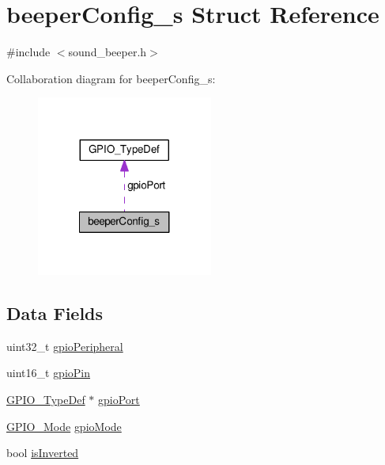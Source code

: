 \hypertarget{structbeeperConfig__s}{\section{beeper\+Config\+\_\+s Struct Reference}
\label{structbeeperConfig__s}
}


{\ttfamily \#include $<$sound\+\_\+beeper.\+h$>$}



Collaboration diagram for beeper\+Config\+\_\+s\+:\nopagebreak
\begin{figure}[H]
\begin{center}
\leavevmode
\includegraphics[width=164pt]{structbeeperConfig__s__coll__graph}
\end{center}
\end{figure}
\subsection*{Data Fields}
\begin{DoxyCompactItemize}
\item 
uint32\+\_\+t \hyperlink{structbeeperConfig__s_a7763aafc418b4ba02c2374623e178698}{gpio\+Peripheral}
\item 
uint16\+\_\+t \hyperlink{structbeeperConfig__s_a13035e9d77a8e465fc04fd8068b96368}{gpio\+Pin}
\item 
\hyperlink{structGPIO__TypeDef}{G\+P\+I\+O\+\_\+\+Type\+Def} $\ast$ \hyperlink{structbeeperConfig__s_a01a3ee259d0c4953217c51f53b802872}{gpio\+Port}
\item 
\hyperlink{test_2unit_2platform_8h_ae647a44ad55704d3f447db1de2858e1b}{G\+P\+I\+O\+\_\+\+Mode} \hyperlink{structbeeperConfig__s_aa9d2793e40da3f3bb4c68fcd9be62f8a}{gpio\+Mode}
\item 
bool \hyperlink{structbeeperConfig__s_aad323590652e0eb58a8ae0dc17a006f0}{is\+Inverted}
\end{DoxyCompactItemize}


